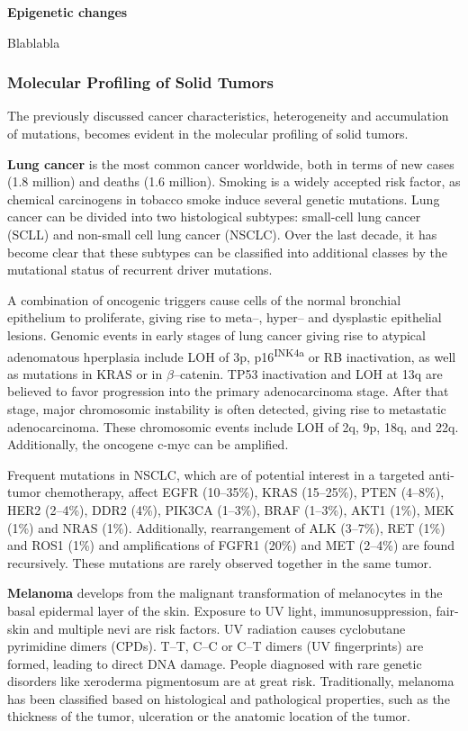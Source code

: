     \textbf{Epigenetic changes}

    Blablabla

    \subsubsection{Molecular Profiling of Solid Tumors}

    The previously discussed cancer characteristics, heterogeneity and
    accumulation of mutations, becomes evident in the molecular profiling
    of solid tumors.

    \textbf{Lung cancer} is the most common cancer worldwide, both in terms of
    new cases (1.8 million) and deaths (1.6 million). Smoking is a widely
    accepted risk factor, as chemical carcinogens in tobacco smoke induce
    several genetic mutations. Lung cancer can be divided
    into two histological subtypes: small-cell lung cancer (SCLL) and non-small
    cell lung cancer (NSCLC). Over the last decade, it has become clear that
    these subtypes can be classified into  additional classes by the mutational
    status of recurrent driver mutations.

    A combination of oncogenic triggers cause cells of the normal bronchial
    epithelium to proliferate, giving rise to meta--, hyper-- and dysplastic
    epithelial lesions. Genomic events in early stages of lung cancer giving
    rise to atypical adenomatous hperplasia include LOH of 3p,
    p16\textsuperscript{INK4a} or RB inactivation, as well as
    mutations in KRAS or in $\beta$--catenin. TP53
    inactivation and LOH at 13q are believed to favor progression into
    the primary adenocarcinoma stage. After that stage, major chromosomic
    instability is often detected, giving rise to metastatic adenocarcinoma.
    These chromosomic events include LOH of 2q, 9p, 18q,
    and 22q. Additionally, the oncogene c-myc can be amplified.

    Frequent  mutations in NSCLC, which are of potential interest in a targeted
    anti-tumor chemotherapy, affect EGFR (10--35\%), KRAS (15--25\%), PTEN
    (4--8\%), HER2 (2--4\%), DDR2 (4\%), PIK3CA (1--3\%), BRAF (1--3\%), AKT1
    (1\%), MEK (1\%) and NRAS (1\%). Additionally, rearrangement of ALK
    (3--7\%), RET (1\%) and ROS1 (1\%) and amplifications of FGFR1 (20\%) and
    MET (2--4\%) are found recursively. These mutations are rarely observed
    together in the same tumor.

    \textbf{Melanoma} develops from the malignant transformation of melanocytes
    in the basal epidermal layer of the skin. Exposure to UV light,
    immunosuppression, fair-skin and multiple nevi are risk factors. UV
    radiation causes cyclobutane pyrimidine dimers (CPDs). T--T, C--C or C--T
    dimers (UV fingerprints) are formed, leading to direct DNA damage. People
    diagnosed with rare genetic disorders like xeroderma pigmentosum are at
    great risk. Traditionally, melanoma has been classified based on
    histological and pathological properties, such as the thickness of the
    tumor, ulceration or the anatomic location of the tumor.


